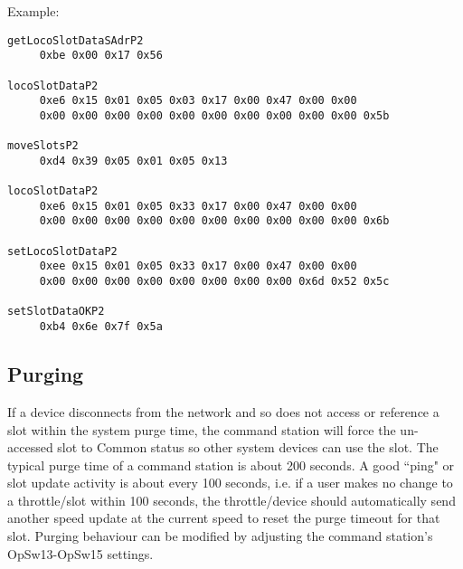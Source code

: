 Example:

\begin{verbatim}
getLocoSlotDataSAdrP2
     0xbe 0x00 0x17 0x56 
     
locoSlotDataP2
     0xe6 0x15 0x01 0x05 0x03 0x17 0x00 0x47 0x00 0x00 
     0x00 0x00 0x00 0x00 0x00 0x00 0x00 0x00 0x00 0x00 0x5b 

moveSlotsP2
     0xd4 0x39 0x05 0x01 0x05 0x13 

locoSlotDataP2
     0xe6 0x15 0x01 0x05 0x33 0x17 0x00 0x47 0x00 0x00 
     0x00 0x00 0x00 0x00 0x00 0x00 0x00 0x00 0x00 0x00 0x6b 

setLocoSlotDataP2
     0xee 0x15 0x01 0x05 0x33 0x17 0x00 0x47 0x00 0x00 
     0x00 0x00 0x00 0x00 0x00 0x00 0x00 0x00 0x6d 0x52 0x5c 

setSlotDataOKP2
     0xb4 0x6e 0x7f 0x5a 
\end{verbatim}
\normalsize

\subsection{Purging}
If a device disconnects from the network and so does not access or reference a slot within the system purge time, the command station will force the un-accessed slot to \gls{Common} status so other system devices can use the slot. The typical purge time of a command station is about 200 seconds. A good ``ping" or slot update activity is about every 100 seconds, i.e. if a user makes no change to a throttle/slot within 100 seconds, the throttle/device should automatically send another speed update at the current speed to reset the purge timeout for that slot. Purging behaviour can be modified by adjusting the command station's OpSw13-OpSw15 settings.

